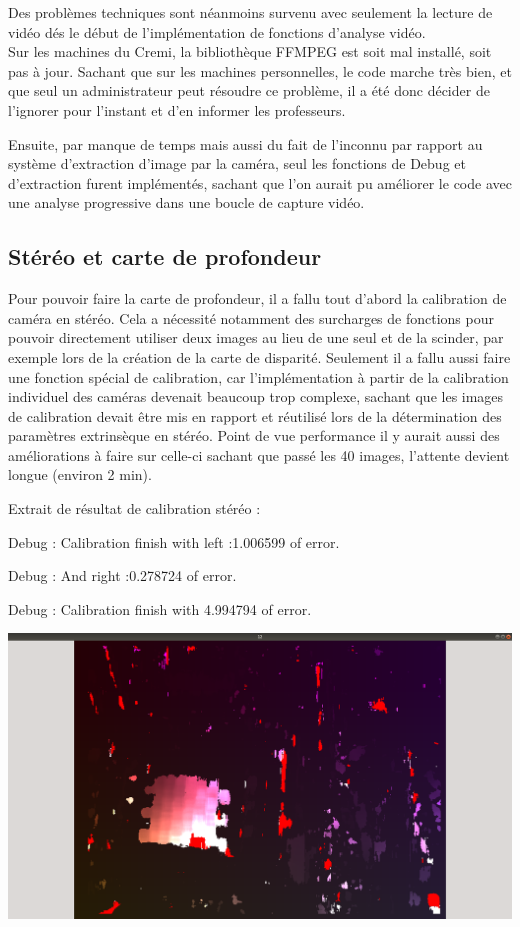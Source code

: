 \documentclass{article}
\begin{document}
Des problèmes techniques sont néanmoins survenu avec seulement la lecture de vidéo dés le début de l’implémentation de fonctions d'analyse vidéo.\\
Sur les machines du Cremi, la bibliothèque FFMPEG est soit mal installé, soit pas à jour. Sachant que sur les machines personnelles, le code marche très bien, et que seul un administrateur peut résoudre ce problème, il a été donc décider de l'ignorer pour l'instant et d'en informer les professeurs.

Ensuite, par manque de temps mais aussi du fait de l'inconnu par rapport au système d'extraction d'image par la caméra, seul les fonctions de Debug et d'extraction furent implémentés, sachant que l'on aurait pu améliorer le code avec une analyse progressive dans une boucle de capture vidéo. 

\par\leavevmode\par
\subsection{Stéréo et carte de profondeur}

    
Pour pouvoir faire la carte de profondeur, il a fallu tout d'abord la calibration de caméra en stéréo.
Cela a nécessité notamment des surcharges de fonctions pour pouvoir directement utiliser deux images au lieu de une seul et de la scinder, par exemple lors de la création de la carte de disparité. Seulement il a fallu aussi faire une fonction spécial de calibration, car l'implémentation à partir de la calibration individuel des caméras devenait beaucoup trop complexe, sachant que les images de calibration devait être mis en rapport et réutilisé lors de la détermination des paramètres extrinsèque en stéréo.
Point de vue performance il y aurait aussi des améliorations à faire sur celle-ci sachant que passé les 40 images, l'attente devient longue (environ 2 min).


Extrait de résultat de calibration stéréo :

Debug :  Calibration finish with left :1.006599 of error. 

Debug :  And right :0.278724 of error. 

Debug :  Calibration finish with 4.994794 of error. 

\includegraphics[width=\linewidth]{img/d_bm.png}
\end{document}
